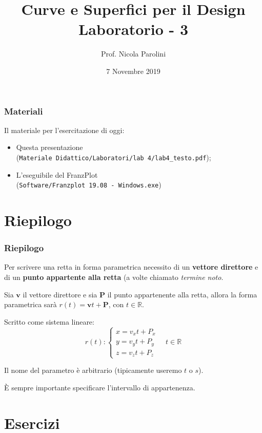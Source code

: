 \documentclass{beamer}
\title[Curve e Sup. - Lab 3]{Curve e Superfici per il Design \\ Laboratorio - 3}
\author[Prof. Parolini]{Prof. Nicola Parolini}
\date{7 Novembre 2019}
\newcommand{\frnzplt}{FranzPlot }
\begin{document}
\begin{frame}
\frametitle{Materiali}
Il materiale per l'esercitazione di oggi:
\begin{itemize}
\item Questa presentazione \\ (\texttt{Materiale Didattico/Laboratori/lab 4/lab4\_testo.pdf});
\item L'eseguibile del \frnzplt \\ (\texttt{Software/Franzplot 19.08 - Windows.exe})
\end{itemize}
\end{frame}


\section{Riepilogo}

\begin{frame}
\frametitle{Riepilogo}
    Per scrivere una retta in forma parametrica necessito di un \textbf{vettore direttore}
    e di un \textbf{punto appartente alla retta} (a volte chiamato \textit{termine noto}.

    \vspace{0.2cm}
    Sia $\mathbf v$ il vettore direttore e sia $\mathbf P$ il punto appartenente alla retta,
    allora la forma parametrica sar\`a $r(t) = \mathbf v t + \mathbf P$, con $t\in \mathbb{R}$.
    
    Scritto come sistema lineare:
\begin{displaymath}
    r(t) :\begin{cases} x = v_x t + P_x\\ y = v_y t + P_y \\z = v_z t + P_z \end{cases}
\quad t\in \mathbb{R}
\end{displaymath}

    \vspace{0.2cm}
    Il nome del parametro \`e arbitrario (tipicamente useremo $t$ o $s$).
    
    \`E sempre importante specificare l'intervallo di appartenenza.
\end{frame}

\section{Esercizi}
\end{document}
